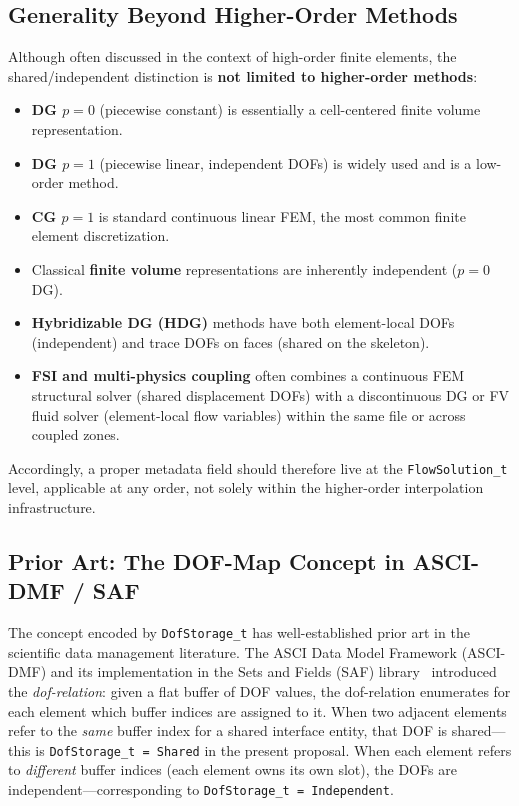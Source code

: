 \documentclass[11pt,letterpaper]{article}
\begin{document}
\subsection{Generality Beyond Higher-Order Methods}

Although often discussed in the context of high-order finite elements,
the shared/independent distinction is \textbf{not limited to
higher-order methods}:

\begin{itemize}[leftmargin=2em]
\item \textbf{DG $p=0$} (piecewise constant) is essentially a
  cell-centered finite volume representation.
\item \textbf{DG $p=1$} (piecewise linear, independent DOFs) is widely
  used and is a low-order method.
\item \textbf{CG $p=1$} is standard continuous linear FEM, the most
  common finite element discretization.
\item Classical \textbf{finite volume} representations are inherently
  independent ($p=0$ DG).
\item \textbf{Hybridizable DG (HDG)} methods have both element-local
  DOFs (independent) and trace DOFs on faces (shared on the
  skeleton).
\item \textbf{FSI and multi-physics coupling} often combines a
  continuous FEM structural solver (shared displacement DOFs) with a
  discontinuous DG or FV fluid solver (element-local flow variables)
  within the same file or across coupled zones.
\end{itemize}

Accordingly, a proper metadata field should therefore live at the
\texttt{FlowSolution\_t} level, applicable at any order, not solely
within the higher-order interpolation infrastructure.

\subsection{Prior Art: The DOF-Map Concept in ASCI-DMF / SAF}

The concept encoded by \texttt{DofStorage\_t} has well-established prior art in the
scientific data management literature.  The ASCI Data Model Framework (ASCI-DMF) and
its implementation in the Sets and Fields (SAF) library~\cite{miller2003} introduced the
\emph{dof-relation}: given a flat buffer of DOF values, the dof-relation enumerates for
each element which buffer indices are assigned to it.  When two adjacent elements refer to
the \emph{same} buffer index for a shared interface entity, that DOF is shared---this is
\texttt{DofStorage\_t = Shared} in the present proposal.  When each element refers to
\emph{different} buffer indices (each element owns its own slot), the DOFs are
independent---corresponding to \texttt{DofStorage\_t = Independent}.
\end{document}
